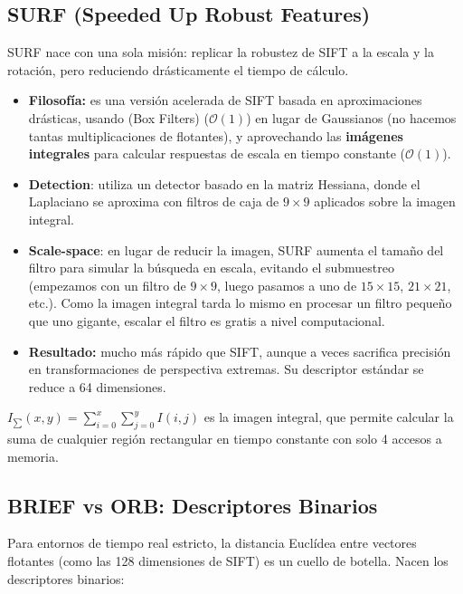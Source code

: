 \subsection{SURF (Speeded Up Robust Features)}
\noindent
SURF nace con una sola misión: replicar la robustez de SIFT a la escala y la rotación, pero reduciendo drásticamente el tiempo de cálculo.
\begin{itemize}
    \item \textbf{Filosofía:} es una versión acelerada de SIFT basada en aproximaciones drásticas, usando  (Box Filters) ($\mathcal{O}(1)$) en lugar de Gaussianos (no hacemos tantas multiplicaciones de flotantes), y aprovechando las \textbf{imágenes integrales} para calcular respuestas de escala en tiempo constante ($\mathcal{O}(1)$).
    \item \textbf{Detection}: utiliza un detector basado en la matriz Hessiana, donde el Laplaciano se aproxima con filtros de caja de $9 \times 9$ aplicados sobre la imagen integral. 
    \item \textbf{Scale-space}: en lugar de reducir la imagen, SURF aumenta el tamaño del filtro para simular la búsqueda en escala, evitando el submuestreo (empezamos con un filtro de $9 \times 9$, luego pasamos a uno de $15 \times 15$, $21 \times 21$, etc.). Como la imagen integral tarda lo mismo en procesar un filtro pequeño que uno gigante, escalar el filtro es gratis a nivel computacional.
    \item \textbf{Resultado:} mucho más rápido que SIFT, aunque a veces sacrifica precisión en transformaciones de perspectiva extremas. Su descriptor estándar se reduce a 64 dimensiones.
\end{itemize}
\begin{observacion}
    $I_{\sum}(x,y)=\sum_{i=0}^{x}\sum_{j=0}^{y}I(i,j)$ es la imagen integral, que permite calcular la suma de cualquier región rectangular en tiempo constante con solo 4 accesos a memoria.
\end{observacion}

\subsection{BRIEF vs ORB: Descriptores Binarios}
\noindent
Para entornos de tiempo real estricto, la distancia Euclídea entre vectores flotantes (como las 128 dimensiones de SIFT) es un cuello de botella. Nacen los descriptores binarios:

